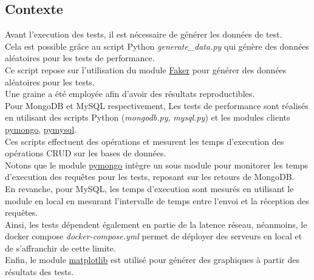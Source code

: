 \documentclass[12pt,a4paper]{report}
\begin{document}
    \subsection{Contexte}
        \begin{card}
            Avant l'execution des tests, il est nécessaire de générer les données de test. \\
            Cela est possible grâce au script Python \textit{generate\_data.py} qui génère des données aléatoires pour les tests de performance. \\
            Ce script repose sur l'utilisation du module \href{https://faker.readthedocs.io}{Faker} pour générer des données aléatoires pour les tests. \\
            Une graine  a été employée afin d'avoir des résultats reproductibles. \\
            Pour MongoDB et MySQL respectivement, Les tests de performance sont réalisés en utilisant des scripts Python (\textit{mongodb.py}, \textit{mysql.py}) et les modules clients \href{https://pymongo.readthedocs.io}{pymongo}, \href{https://pymysql.readthedocs.io}{pymysql}. \\
            Ces scripts effectuent des opérations et mesurent les temps d'execution des opérations CRUD sur les bases de données. \\
            Notons que le module \href{https://pymongo.readthedocs.io}{pymongo} intègre un sous module pour monitorer les temps d'execution des requêtes pour les tests, reposant sur les retours de MongoDB. \\
            En revanche, pour MySQL, les temps d'execution sont mesurés en utilisant le module en local en mesurant l'intervalle de temps entre l'envoi et la réception des requêtes. \\
            Ainsi, les tests dépendent également en partie de la latence réseau, néanmoins, le docker compose \textit{docker-compose.yml} permet de déployer des serveurs en local et de s'affranchir de cette limite. \\
            Enfin, le module \href{https://matplotlib.org}{matplotlib} est utilisé pour générer des graphiques à partir des résultats des tests.
        \end{card}
\end{document}
